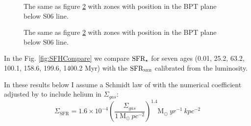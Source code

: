 \documentclass[a4paper,11pt]{article}
\begin{document}
\begin{figure*}
\caption{The same as figure \ref{fig:SigmaSFHCompareBS06} with zones with position in the BPT plane below S06 line.}
\label{fig:SFHCompareBS06}
\end{figure*}

\begin{figure*}
\caption{The same as figure \ref{fig:SigmaSFHCompareBS06} with zones with position in the BPT plane below S06 line.}
\label{fig:SigmaSFHCompareBS06}
\end{figure*}


In the Fig. \ref{fig:SFHCompare} we compare $\textrm{SFR}_\star$ for seven ages (0.01, 25.2, 63.2, 100.1, 158.6, 199.6, 1400.2 Myr) with the $\textrm{SFR}_{\textsc{neb}}$ calibrated from the \Halpha luminosity. 
 
In these results below I assume a Schmidt law of \citet{Kennicutt.1998a} with the numerical coefficient adjusted by \citet{Tremonti.etal.2004a} to include helium in $\Sigma_{gas}$:
\begin{equation}
	\Sigma_{\textrm{SFR}} = 1.6 \times 10^{-4} \left(\frac{\Sigma_{gas}}{1\ \textrm{M}_\odot\ pc^{-2}}\right)^{1.4} \textrm{M}_\odot\ yr^{-1}\ kpc^{-2}
\end{equation}




\end{document}
